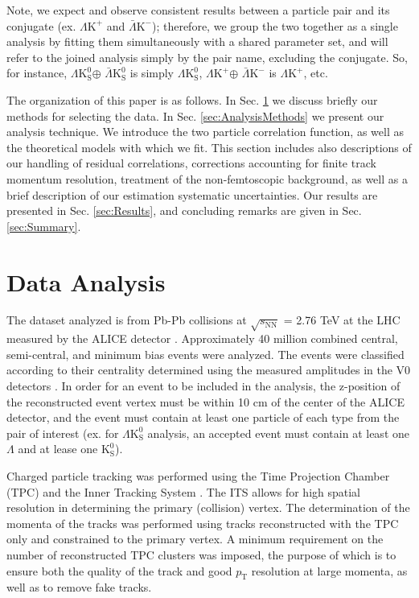 \documentclass[ALICE,manyauthors]{cernphprep}
\newcommand{\pt}{$p_{\mathrm{T}}$\xspace}
\newcommand{\Lam}{$\Lambda$\xspace}
\newcommand{\Ks}{$\mathrm{K^{0}_{S}}$\xspace}
\newcommand{\LamKchP}{$\Lambda\mathrm{K^{+}}$\xspace}
\newcommand{\ALamKchM}{$\bar{\Lambda}\mathrm{K^{-}}$\xspace}
\newcommand{\LamKs}{$\Lambda\mathrm{K^{0}_{S}}$\xspace}
\newcommand{\ALamKs}{$\bar{\Lambda}\mathrm{K^{0}_{S}}$\xspace}
\begin{document}
Note, we expect and observe consistent results between a particle pair and its conjugate (ex. \LamKchP and \ALamKchM); therefore, we group the two together as a single analysis by fitting them simultaneously with a shared parameter set, and will refer to the joined analysis simply by the pair name, excluding the conjugate.  
So, for instance, \LamKs $\oplus$ \ALamKs is simply \LamKs, \LamKchP $\oplus$ \ALamKchM is \LamKchP, etc.  

The organization of this paper is as follows.  In Sec. \ref{sec:DataAnalysis} we discuss briefly our methods for selecting the data.  In Sec. \ref{sec:AnalysisMethods} we present our analysis technique.  We introduce the two particle correlation function, as well as the theoretical models with which we fit.  This section includes also descriptions of our handling of residual correlations, corrections accounting for finite track momentum resolution, treatment of the non-femtoscopic background, as well as a brief description of our estimation systematic uncertainties.  Our results are presented in Sec. \ref{sec:Results}, and concluding remarks are given in Sec. \ref{sec:Summary}.

\section{Data Analysis}
\label{sec:DataAnalysis}

The dataset analyzed is from Pb-Pb collisions at $\sqrt{s_{\mathrm{NN}}}$ = 2.76 TeV at the LHC measured by the ALICE detector \cite{1748-0221-3-08-S08002}.
Approximately 40 million combined central, semi-central, and minimum bias events were analyzed.
The events were classified according to their centrality determined using the measured amplitudes in the V0 detectors \cite{Abelev:2013qoq}.  
In order for an event to be included in the analysis, the z-position of the reconstructed event vertex must be within 10 cm of the center of the ALICE detector, and the event must contain at least one particle of each type from the pair of interest (ex. for \LamKs analysis, an accepted event must contain at least one \Lam and at lease one \Ks). 

Charged particle tracking was performed using the Time Projection Chamber (TPC) \cite{2010NIMPA.622..316A} and the Inner Tracking System \cite{1748-0221-3-08-S08002}.  
The ITS allows for high spatial resolution in determining the primary (collision) vertex.
The determination of the momenta of the tracks was performed using tracks reconstructed with the TPC only and constrained to the primary vertex.
A minimum requirement on the number of reconstructed TPC clusters was imposed, the purpose of which is to ensure both the quality of the track and good \pt resolution at large momenta, as well as to remove fake tracks.
\end{document}
